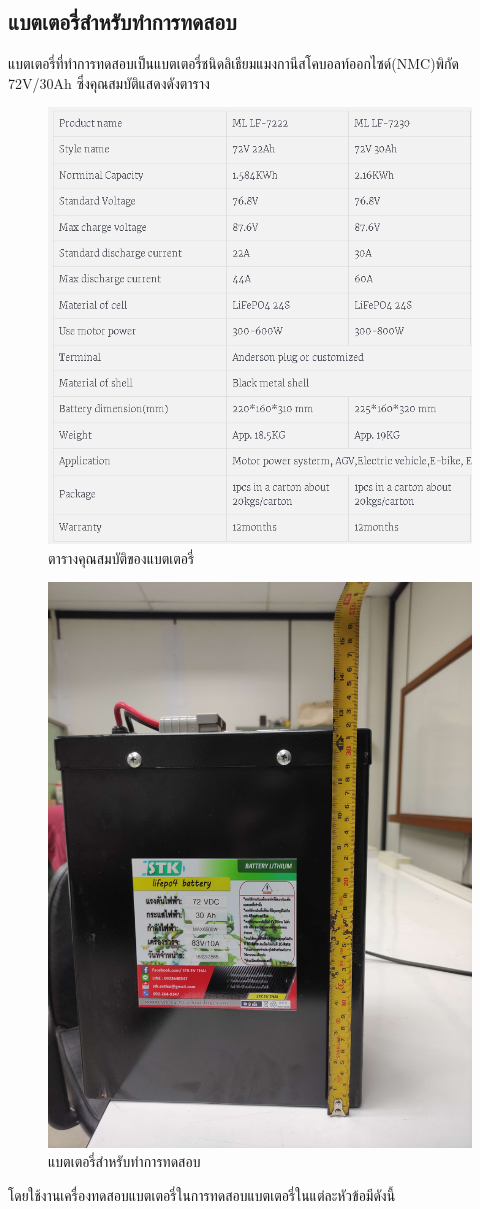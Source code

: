 \subsection{แบตเตอรี่สำหรับทำการทดสอบ}
แบตเตอรี่ที่ทำการทดสอบเป็นแบตเตอรี่ชนิดลิเธียมแมงกานีสโคบอลท์ออกไซด์(NMC)พิกัด 72V/30Ah ซึ่งคุณสมบัติแสดงดังตาราง
\begin{center}
	\begin{figure}[H]
		\includegraphics[width=0.5\linewidth]{Chapters/img/Battery_name_plate.PNG}
		\centering
		\captionsetup{justification=centering,margin=2cm}
		\caption{ตารางคุณสมบัติของแบตเตอรี่}
	\end{figure}
	\begin{figure}[H]
		\includegraphics[width=0.5\linewidth]{Chapters/img/Battery_72V_30AH}
		\centering
		\captionsetup{justification=centering,margin=2cm}
		\caption{แบตเตอรี่สำหรับทำการทดสอบ}
	\end{figure}
\end{center}
โดยใช้งานเครื่องทดสอบแบตเตอรี่ในการทดสอบแบตเตอรี่ในแต่ละหัวข้อมีดังนี้
